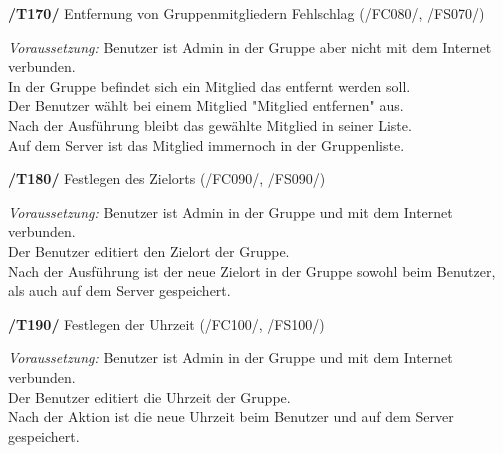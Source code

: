 \textbf{/T170/} Entfernung von Gruppenmitgliedern Fehlschlag (/FC080/, /FS070/)\\
\begin{center}
\vspace{-\parskip}
\begin{minipage}[t]{0.9\textwidth}
\emph{Voraussetzung:} Benutzer ist Admin in der Gruppe aber nicht mit dem Internet verbunden.\\
In der Gruppe befindet sich ein Mitglied das entfernt werden soll.\\
Der Benutzer wählt bei einem Mitglied "Mitglied entfernen" aus.    \\
Nach der Ausführung bleibt das gewählte Mitglied in seiner Liste.   \\
Auf dem Server ist das Mitglied immernoch in der Gruppenliste.       \\
\end{minipage}
\end{center}

\textbf{/T180/} Festlegen des Zielorts (/FC090/, /FS090/)\\
\begin{center}
\vspace{-\parskip}
\begin{minipage}[t]{0.9\textwidth}
\emph{Voraussetzung:} Benutzer ist Admin in der Gruppe und mit dem Internet verbunden.\\
Der Benutzer editiert den Zielort der Gruppe.                                   \\
Nach der Ausführung ist der neue Zielort in der Gruppe sowohl beim Benutzer,     \\
als auch auf dem Server gespeichert.                                              \\
\end{minipage}
\end{center}

\textbf{/T190/} Festlegen der Uhrzeit (/FC100/, /FS100/)\\
\begin{center}
\vspace{-\parskip}
\begin{minipage}[t]{0.9\textwidth}
\emph{Voraussetzung:} Benutzer ist Admin in der Gruppe und mit dem Internet verbunden.    \\
Der Benutzer editiert die Uhrzeit der Gruppe.                                       \\
Nach der Aktion ist die neue Uhrzeit beim Benutzer und auf dem Server gespeichert.   \\
\end{minipage}
\end{center}


